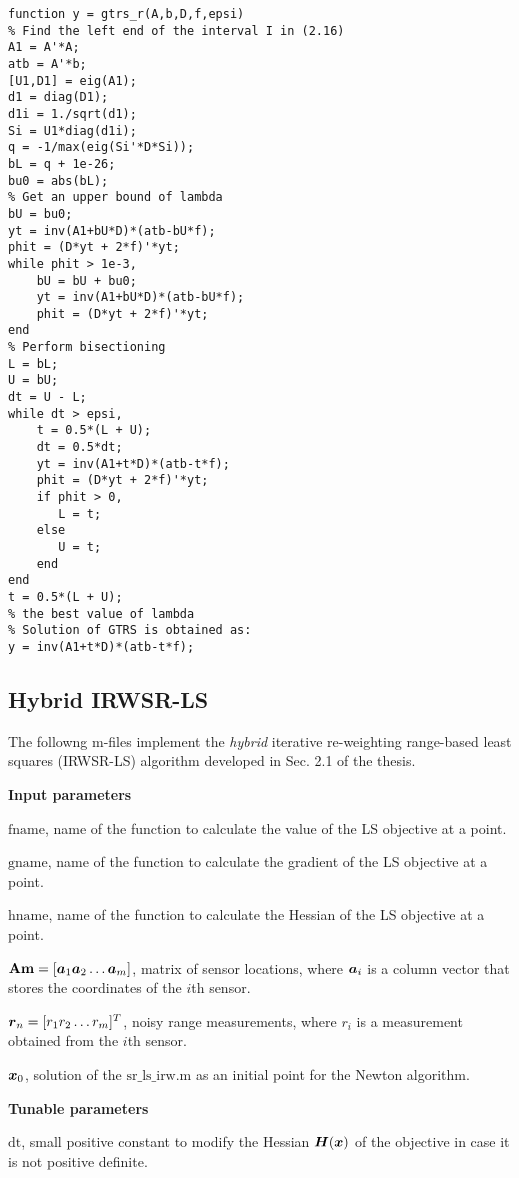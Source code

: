 \begin{lstlisting}
function y = gtrs_r(A,b,D,f,epsi)
% Find the left end of the interval I in (2.16)
A1 = A'*A;
atb = A'*b;
[U1,D1] = eig(A1);
d1 = diag(D1);
d1i = 1./sqrt(d1);
Si = U1*diag(d1i);
q = -1/max(eig(Si'*D*Si));
bL = q + 1e-26;
bu0 = abs(bL);
% Get an upper bound of lambda
bU = bu0;
yt = inv(A1+bU*D)*(atb-bU*f);
phit = (D*yt + 2*f)'*yt;
while phit > 1e-3,
    bU = bU + bu0;
    yt = inv(A1+bU*D)*(atb-bU*f);
    phit = (D*yt + 2*f)'*yt;
end
% Perform bisectioning
L = bL;
U = bU;
dt = U - L;
while dt > epsi,
    t = 0.5*(L + U);
    dt = 0.5*dt;
    yt = inv(A1+t*D)*(atb-t*f);
    phit = (D*yt + 2*f)'*yt;
    if phit > 0,
       L = t;
    else
       U = t;
    end
end
t = 0.5*(L + U);
% the best value of lambda
% Solution of GTRS is obtained as:
y = inv(A1+t*D)*(atb-t*f);
\end{lstlisting}

\subsection{Hybrid IRWSR-LS}

The followng m-files implement the \textit{hybrid} iterative re-weighting range-based least squares (IRWSR-LS) algorithm developed in Sec. 2.1 of the thesis. 

\noindent
\textbf{Input parameters}

\noindent
$\mbox{fname}$, name of the function to calculate the value of the LS objective at a point.

\noindent
$\mbox{gname}$, name of the function to calculate the gradient of the LS objective at a point.

\noindent
$\mbox{hname}$, name of the function to calculate the Hessian of the LS objective at a point.

\noindent
$\mbox{\textbf{Am}} = [\mbox{\boldmath$a$}_1 \mbox{\boldmath$a$}_2 \ldots \mbox{\boldmath$a$}_m]$, matrix of sensor locations, where $\mbox{\boldmath$a$}_i$ is a column vector that stores the coordinates of the $i$th sensor.

\noindent
$\mbox{\boldmath$r$}_n = [r_1 r_2 \ldots r_m]^T$, noisy range measurements, where $r_i$ is a measurement obtained from the $i$th sensor.

\noindent
$\mbox{\boldmath$x$}_0$, solution of the $\mbox{sr\_ls\_irw.m}$ as an initial point for the Newton algorithm.

\noindent
\textbf{Tunable parameters}

\noindent
$\mbox{dt}$, small positive constant to modify the Hessian $\mbox{\boldmath$H$}(\mbox{\boldmath$x$})$ of the objective in case it is not positive definite.

